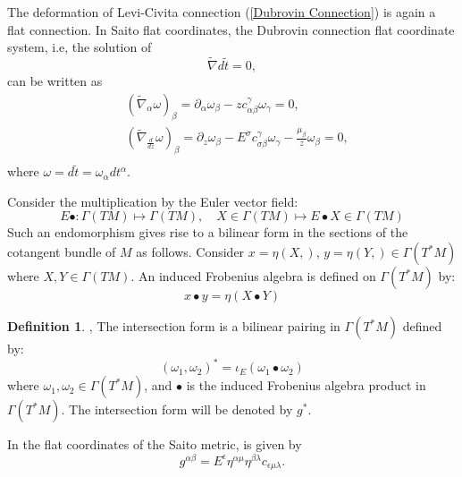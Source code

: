 \documentclass{article}
\theoremstyle{definition}
\newtheorem{definition}{Definition}[section]
\begin{document}
The deformation of Levi-Civita connection (\ref{Dubrovin Connection}) is again a flat connection. In Saito flat coordinates, the Dubrovin connection flat coordinate system, i.e, the solution of 
\begin{equation*}
\tilde \nabla d\tilde t=0,
\end{equation*}
 can be written as
 \begin{equation}\label{flat section Dubrovin connection}
 \begin{split}
&\left(\tilde \nabla_{\alpha} \omega\right)_{\beta}=\partial_{\alpha}\omega_{\beta}-zc_{\alpha\beta}^{\gamma}\omega_{\gamma}=0,\\
&\left(\tilde \nabla_{\frac{d}{dz}} \omega\right)_{\beta}=\partial_{z}\omega_{\beta}-E^{\sigma}c_{\sigma\beta}^{\gamma}\omega_{\gamma}-\frac{\mu_{\beta}}{z}\omega_{\beta}=0,\\
\end{split}
\end{equation}
 where $\omega=d\tilde t=\omega_{\alpha}dt^{\alpha}$. 

Consider the multiplication by the Euler vector field:
\begin{equation}\label{multiplication by the Euler vector field endomorphism}
E\bullet: \Gamma(TM) \mapsto \Gamma(TM), \quad X \in \Gamma(TM) \mapsto E\bullet X \in \Gamma(TM)
\end{equation}
Such an endomorphism gives rise to a bilinear form in the sections of the cotangent bundle of $M$ as follows. Consider $x = \eta(X, )$, $y = \eta(Y, ) \in \Gamma(T^*M)$ where $X, Y \in \Gamma(TM)$. An induced Frobenius algebra is defined on $\Gamma(T^*M)$ by:
\begin{equation*}
x \bullet y = \eta(X \bullet Y)
\end{equation*}

\begin{definition}\cite{B. Dubrovin2},\cite{B. Dubrovin3}
The intersection form is a bilinear pairing in $\Gamma(T^*M)$ defined by:
\begin{equation*}
(\omega_1, \omega_2)^* = \iota_E(\omega_1 \bullet \omega_2)
\end{equation*}
where $\omega_1, \omega_2 \in \Gamma(T^*M)$, and $\bullet$ is the induced Frobenius algebra product in $\Gamma(T^*M)$. The intersection form will be denoted by $g^*$. 
\end{definition}


In the flat coordinates of the Saito metric, is given by
\begin{equation}\label{intersection form generic in flat coordinates}
g^{\alpha\beta} = E^{\epsilon}\eta^{\alpha\mu}\eta^{\beta\lambda}c_{\epsilon\mu\lambda}.
\end{equation}
\end{document}
